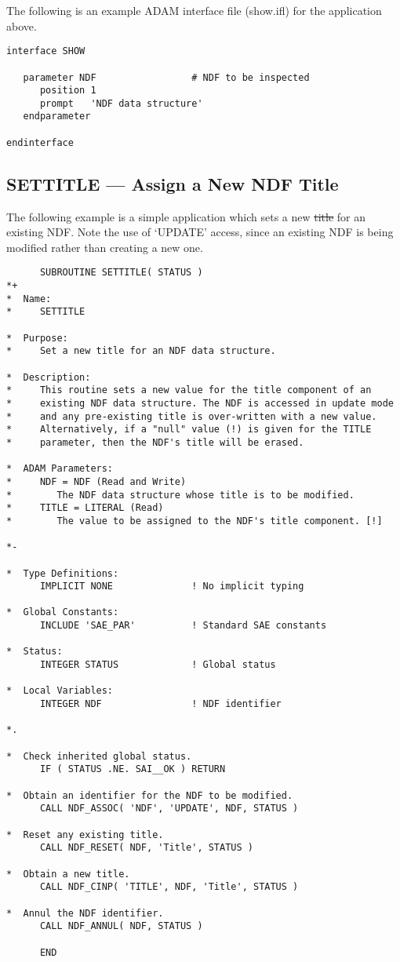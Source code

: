 The following is an example ADAM interface file (show.ifl) for the application
above. 

\small
\begin{verbatim}
interface SHOW

   parameter NDF                 # NDF to be inspected
      position 1
      prompt   'NDF data structure'
   endparameter

endinterface
\end{verbatim}
\normalsize

\newpage
\subsection{\label{ss:titleexample}SETTITLE --- Assign a New NDF Title}

The following example is a simple application which sets a new
\st{title\/} for an existing NDF. Note the use of `UPDATE' access,
since an 
existing NDF is being modified rather than creating a new one.

\small
\begin{verbatim}
      SUBROUTINE SETTITLE( STATUS )
*+
*  Name:
*     SETTITLE

*  Purpose:
*     Set a new title for an NDF data structure.

*  Description:
*     This routine sets a new value for the title component of an
*     existing NDF data structure. The NDF is accessed in update mode
*     and any pre-existing title is over-written with a new value.
*     Alternatively, if a "null" value (!) is given for the TITLE
*     parameter, then the NDF's title will be erased.

*  ADAM Parameters:
*     NDF = NDF (Read and Write)
*        The NDF data structure whose title is to be modified.
*     TITLE = LITERAL (Read)
*        The value to be assigned to the NDF's title component. [!]

*-
      
*  Type Definitions:
      IMPLICIT NONE              ! No implicit typing

*  Global Constants:
      INCLUDE 'SAE_PAR'          ! Standard SAE constants

*  Status:
      INTEGER STATUS             ! Global status

*  Local Variables:
      INTEGER NDF                ! NDF identifier

*.

*  Check inherited global status.
      IF ( STATUS .NE. SAI__OK ) RETURN

*  Obtain an identifier for the NDF to be modified.
      CALL NDF_ASSOC( 'NDF', 'UPDATE', NDF, STATUS )

*  Reset any existing title.
      CALL NDF_RESET( NDF, 'Title', STATUS )

*  Obtain a new title.
      CALL NDF_CINP( 'TITLE', NDF, 'Title', STATUS )

*  Annul the NDF identifier.
      CALL NDF_ANNUL( NDF, STATUS )

      END
\end{verbatim}
\normalsize

